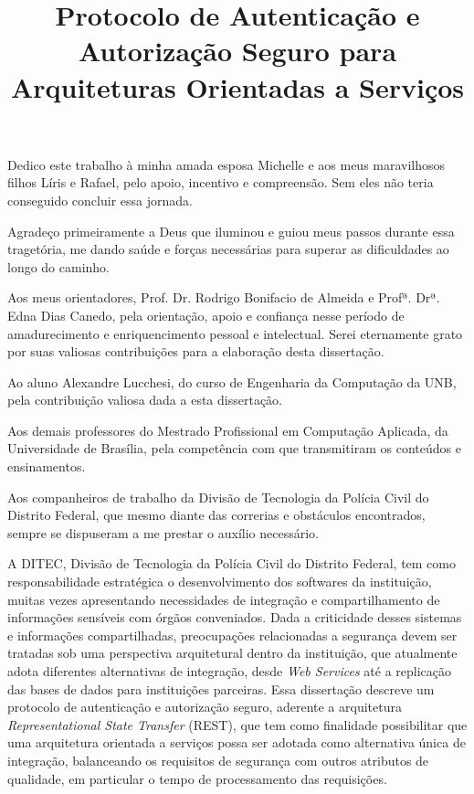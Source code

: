 \documentclass[mpca]{unb-cic}
\title{Protocolo de Autenticação e Autorização Seguro para Arquiteturas Orientadas a Serviços}%
\begin{document}
  \maketitle

  \begin{dedicatoria}
  Dedico este trabalho à minha amada esposa Michelle e aos meus maravilhosos filhos Líris e Rafael, pelo apoio, incentivo e compreensão. Sem eles não teria conseguido concluir essa jornada.
     
  \end{dedicatoria}

  \begin{agradecimentos}
   Agradeço primeiramente a Deus que iluminou e guiou meus passos durante essa tragetória, me dando saúde e forças necessárias para superar as dificuldades ao longo do caminho.
   
   Aos meus orientadores, Prof. Dr. Rodrigo Bonifacio de Almeida e Profª. Drª. Edna Dias Canedo, pela orientação, apoio e confiança nesse período de amadurecimento e enriquencimento pessoal e intelectual. Serei eternamente grato por suas valiosas contribuições para a elaboração desta dissertação.
   
   Ao aluno Alexandre Lucchesi, do curso de Engenharia da Computação da UNB, pela contribuição valiosa dada a esta dissertação.
   
   Aos demais professores do Mestrado Profissional em Computação Aplicada, da Universidade de Brasília, pela competência com que transmitiram os conteúdos e ensinamentos.
   
   Aos companheiros de trabalho da Divisão de Tecnologia da Polícia Civil do Distrito Federal, que mesmo diante das correrias e obstáculos encontrados, sempre se dispuseram a me prestar o auxílio necessário.
   
  
  \end{agradecimentos}


\begin{resumo}
 A DITEC, Divisão de Tecnologia da Polícia Civil do Distrito Federal, tem como responsabilidade estratégica o desenvolvimento dos softwares da instituição, muitas vezes apresentando necessidades de integração e compartilhamento de informações sensíveis com órgãos conveniados. Dada a criticidade desses sistemas e informações compartilhadas, preocupações relacionadas a segurança devem ser tratadas sob uma perspectiva arquitetural dentro da instituição, que atualmente adota diferentes alternativas de integração, desde \emph{Web Services} até a replicação das bases de dados para instituições parceiras. Essa dissertação descreve  um protocolo de autenticação e autorização seguro, aderente a arquitetura \emph{Representational State Transfer} (REST), que tem como finalidade possibilitar que uma arquitetura orientada a serviços possa ser adotada como alternativa única de integração, balanceando os requisitos de segurança com outros atributos de qualidade,  em particular o tempo de processamento das requisições.
\end{resumo}
\end{document}
